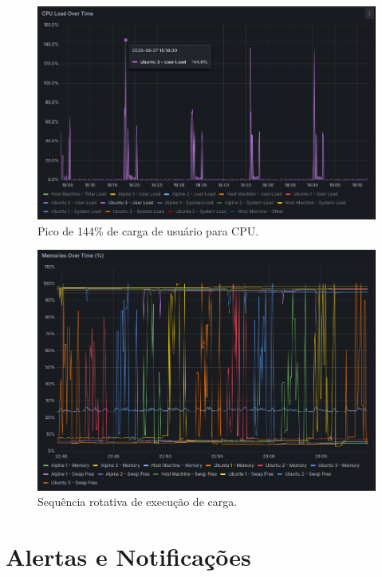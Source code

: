 \begin{figure}[H]
\centering
\setlength{\abovecaptionskip}{-20pt}
\includegraphics[width=\textwidth]{Imagens/chap04/dashboard/cpu144.png}
\caption{Pico de 144\% de carga de usuário para CPU.}
\label{fig:dashboard-cpu144}
\end{figure}

\begin{figure}[H]
\centering
\setlength{\abovecaptionskip}{-20pt}
\includegraphics[width=\textwidth]{Imagens/chap04/dashboard/round_robin_sequence.png}
\caption{Sequência rotativa de execução de carga.}
\label{fig:roundrobin}
\end{figure}

\section{Alertas e Notificações}
\label{section:Alertas}

